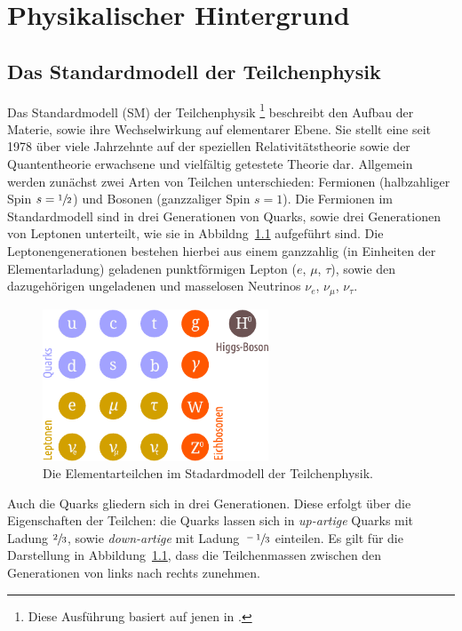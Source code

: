 \chapter{Physikalischer Hintergrund}
\label{chap:2}
%
\section{Das Standardmodell der Teilchenphysik}
%
Das Standardmodell (SM) der Teilchenphysik \footnote{Diese Ausführung basiert auf jenen in  \cite{griffiths, HalzenMartin}.} beschreibt den Aufbau der Materie, sowie ihre Wechselwirkung auf elementarer Ebene. Sie stellt eine seit 1978 \cite{griffiths} über viele Jahrzehnte auf der speziellen Relativitätstheorie sowie der Quantentheorie erwachsene und vielfältig getestete Theorie dar. Allgemein werden zunächst zwei Arten von Teilchen unterschieden: Fermionen (halbzahliger Spin $s=\sfrac{1}{2}$) und Bosonen (ganzzaliger Spin $s=1$). Die Fermionen im Standardmodell sind in drei Generationen von Quarks, sowie drei Generationen von Leptonen unterteilt, wie sie in Abbildng~\ref{fig:particles} aufgeführt sind. Die Leptonengenerationen bestehen hierbei aus einem ganzzahlig (in Einheiten der Elementarladung) geladenen punktförmigen Lepton ($e$, $\mu$, $\tau$), sowie den dazugehörigen ungeladenen und masselosen Neutrinos $\nu_e$, $\nu_\mu$, $\nu_\tau$.
%
\begin{figure}
  \centering
      \includegraphics[width=0.6\textwidth]{Plots/SM.pdf}
  \caption{Die Elementarteilchen im Stadardmodell der Teilchenphysik.}
  \label{fig:particles}
\end{figure}
%
Auch die Quarks gliedern sich in drei Generationen. Diese erfolgt über die Eigenschaften der Teilchen: die Quarks lassen sich in \textit{up-artige} Quarks mit Ladung $\sfrac{2}{3}$, sowie \textit{down-artige} mit Ladung $\sfrac{-1}{3}$ einteilen. Es gilt für die Darstellung in Abbildung~\ref{fig:particles}, dass die Teilchenmassen zwischen den Generationen von links nach rechts zunehmen.\\
